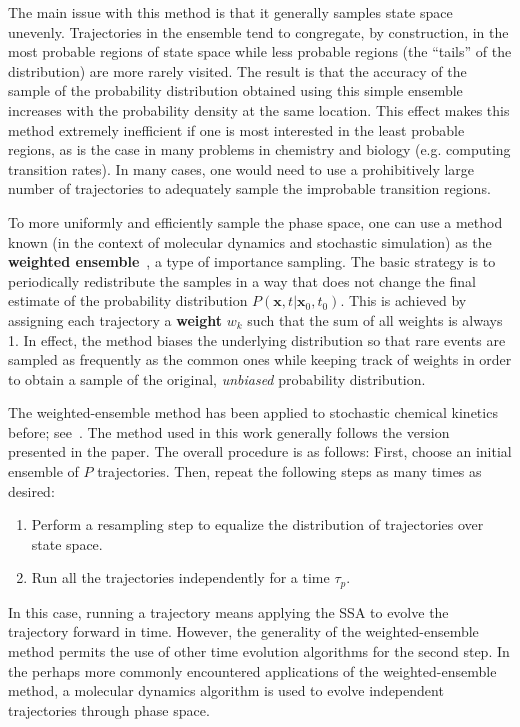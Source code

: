 \documentclass[english,letterpaper,12pt]{article}
\newcommand{\defkeywd}[1]{\textbf{#1}}
\renewcommand{\vec}[1]{\ensuremath{\mathbf{#1}}}
\begin{document}
\begin{doublespacing}
The main issue with this method is that it generally samples state space unevenly. Trajectories in the ensemble tend to congregate, by construction, in the most probable regions of state space while less probable regions (the ``tails'' of the distribution) are more rarely visited. The result is that the accuracy of the sample of the probability distribution obtained using this simple ensemble increases with the probability density at the same location. This effect makes this method extremely inefficient if one is most interested in the least probable regions, as is the case in many problems in chemistry and biology (e.g. computing transition rates).
In many cases,  one would need to use a prohibitively large number of trajectories to adequately sample the improbable transition regions.

To more uniformly and efficiently sample the phase space, one can use a method known (in the context of molecular dynamics and stochastic simulation) as the \defkeywd{weighted ensemble}~\cite{we-orig}, a type of importance sampling. The basic strategy is to periodically redistribute the samples in a way that does not change the final estimate of the probability distribution $P(\vec{x}, t | \vec{x}_0, t_0)$. This is achieved by assigning each trajectory a \defkeywd{weight} $w_k$ such that the sum of all weights is always 1. In effect, the method biases the underlying distribution so that rare events are sampled as frequently as the common ones while keeping track of weights in order to obtain a sample of the original, \emph{unbiased} probability distribution.

The weighted-ensemble method has been applied to stochastic chemical kinetics before; see~\cite{we-chemkin}. The method used in this work generally follows the version presented in the paper. The overall procedure is as follows: First, choose an initial ensemble of $P$ trajectories. Then, repeat the following steps as many times as desired:
\begin{enumerate}
    \item Perform a resampling step to equalize the distribution of trajectories over state space.
    \item Run all the trajectories independently for a time $\tau_p$.
\end{enumerate}
In this case, running a trajectory means applying the SSA to evolve the trajectory forward in time. However, the generality of the weighted-ensemble method permits the use of other time evolution algorithms for the second step. In the perhaps more commonly encountered applications of the weighted-ensemble method, a molecular dynamics algorithm is used to evolve independent trajectories through phase space.


\end{doublespacing}
\end{document}
